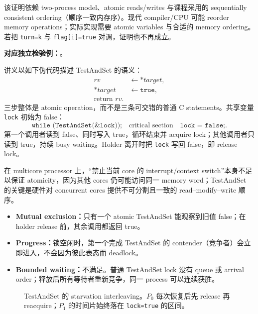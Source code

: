 该证明依赖 two-process model、atomic reads/writes 与课程采用的 sequentially consistent ordering（顺序一致内存序）。现代 compiler/CPU 可能 reorder memory operations；实际实现需要 atomic variables 与合适的 memory ordering。若把 \texttt{turn=k} 与 \texttt{flag[i]=true} 对调，证明也不再成立。

\textbf{对应独立检验例：}。



讲义以如下伪代码描述 TestAndSet 的语义：
\[
\begin{aligned}
  rv &\gets *target,\\
  *target &\gets \texttt{true},\\
  \text{return }rv.
\end{aligned}
\]
三步整体是 atomic operation，而不是三条可交错的普通 C statements。共享变量 \texttt{lock} 初始为 false：
\[
  \texttt{while (TestAndSet(\&lock));}\quad
  \text{critical section}\quad
  \texttt{lock = false;}.
\]
第一个调用者读到 false、同时写入 true，循环结束并 acquire lock；其他调用者只读到 true，持续 busy waiting。Holder 离开时把 \texttt{lock} 写回 false，即 release lock。

在 multicore processor 上，“禁止当前 core 的 interrupt/context switch”本身不足以保证 atomicity，因为其他 cores 仍可能访问同一 memory word；TestAndSet 的关键是硬件对 concurrent cores 提供不可分割且一致的 read--modify--write 顺序。


\begin{itemize}
  \item \textbf{Mutual exclusion：}只有一个 atomic TestAndSet 能观察到旧值 false；在 holder release 前，其余调用都返回 true。
  \item \textbf{Progress：}锁空闲时，第一个完成 TestAndSet 的 contender（竞争者）会立即进入，不会因为彼此表态而 deadlock。
  \item \textbf{Bounded waiting：}不满足。普通 TestAndSet lock 没有 queue 或 arrival order；释放后所有等待者重新竞争，同一 process 可以连续获胜。
\end{itemize}

\begin{figure}[htbp]
  \centering
  \resizebox{0.96\textwidth}{!}{}
  \caption{TestAndSet 的 starvation interleaving。$P_0$ 每次恢复后先 release 再 reacquire；$P_1$ 的时间片始终落在 \texttt{lock=true} 的区间。}
  \label{fig:sc2005-l08-tas-starvation}
\end{figure}

